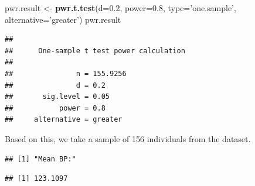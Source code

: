 \documentclass[12pt,]{book}
\newenvironment{Shaded}{\begin{snugshade}}{\end{snugshade}}
\newcommand{\DataTypeTok}[1]{\textcolor[rgb]{0.13,0.29,0.53}{#1}}
\newcommand{\FloatTok}[1]{\textcolor[rgb]{0.00,0.00,0.81}{#1}}
\newcommand{\KeywordTok}[1]{\textcolor[rgb]{0.13,0.29,0.53}{\textbf{#1}}}
\newcommand{\NormalTok}[1]{#1}
\newcommand{\OperatorTok}[1]{\textcolor[rgb]{0.81,0.36,0.00}{\textbf{#1}}}
\newcommand{\StringTok}[1]{\textcolor[rgb]{0.31,0.60,0.02}{#1}}
\begin{document}
\begin{Shaded}
\begin{Highlighting}[]
\NormalTok{pwr.result <-}\StringTok{ }\KeywordTok{pwr.t.test}\NormalTok{(}\DataTypeTok{d=}\FloatTok{0.2}\NormalTok{, }\DataTypeTok{power=}\FloatTok{0.8}\NormalTok{, }
           \DataTypeTok{type=}\StringTok{'one.sample'}\NormalTok{, }
           \DataTypeTok{alternative=}\StringTok{'greater'}\NormalTok{)}
\NormalTok{pwr.result}
\end{Highlighting}
\end{Shaded}

\begin{verbatim}
## 
##      One-sample t test power calculation 
## 
##               n = 155.9256
##               d = 0.2
##       sig.level = 0.05
##           power = 0.8
##     alternative = greater
\end{verbatim}

Based on this, we take a sample of 156 individuals from the dataset.

\begin{Shaded}
\end{Shaded}

\begin{verbatim}
## [1] "Mean BP:"
\end{verbatim}

\begin{Shaded}
\end{Shaded}

\begin{verbatim}
## [1] 123.1097
\end{verbatim}
\end{document}
